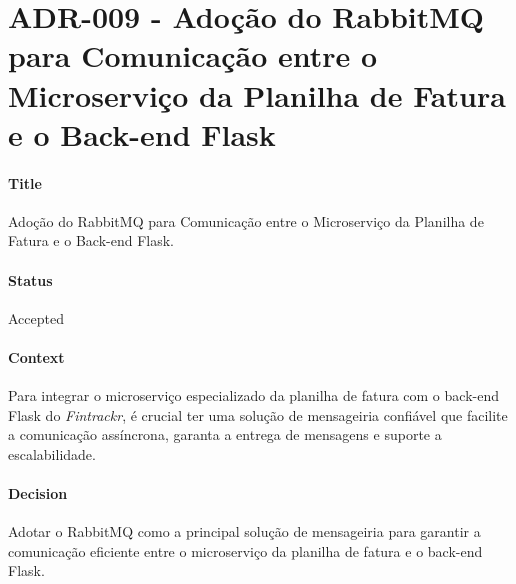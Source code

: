 \chapter{ADR-009 - Adoção do RabbitMQ para Comunicação entre o Microserviço da Planilha de Fatura e o Back-end Flask}
\label{apendiceADR009}

\subsubsection*{Title}
Adoção do RabbitMQ para Comunicação entre o Microserviço da Planilha de Fatura e o Back-end Flask.

\subsubsection*{Status}
Accepted

\subsubsection*{Context}
Para integrar o microserviço especializado da planilha de fatura com o back-end Flask do \textit{Fintrackr}, é crucial ter uma solução de mensageiria confiável que facilite a comunicação assíncrona, garanta a entrega de mensagens e suporte a escalabilidade.

\subsubsection*{Decision}
Adotar o RabbitMQ como a principal solução de mensageiria para garantir a comunicação eficiente entre o microserviço da planilha de fatura e o back-end Flask.

